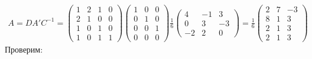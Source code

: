 \begin{gather}
    A = DA'C^{-1} = 
    \begin{pmatrix}
        1 & 2 & 1 & 0 \\
        2 & 1 & 0 & 0 \\
        1 & 0 & 1 & 0 \\
        1 & 0 & 1 & 1 
    \end{pmatrix}
    \begin{pmatrix}
        1 & 0 & 0 \\
        0 & 1 & 0 \\
        0 & 0 & 1 \\
        0 & 0 & 0
    \end{pmatrix} \frac{1}{6}
    \begin{pmatrix}
         4 & -1 &  3 \\
         0 &  3 & -3 \\
        -2 &  2 &  0
    \end{pmatrix} = \frac{1}{6}
    \begin{pmatrix}
        2 & 7 & -3 \\
        8 & 1 &  3 \\
        2 & 1 &  3 \\
        2 & 1 &  3 
    \end{pmatrix}
\end{gather}
Проверим:
